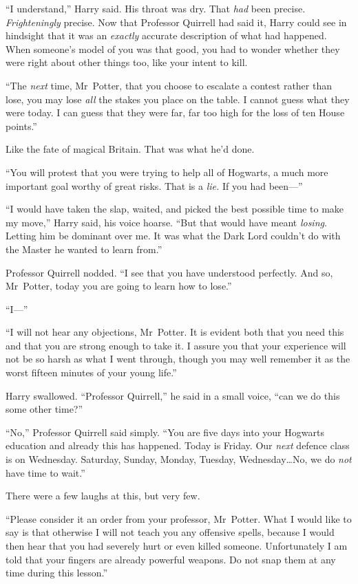 “I understand,” Harry said. His throat was dry. That \emph{had} been precise. \emph{Frighteningly} precise. Now that Professor Quirrell had said it, Harry could see in hindsight that it was an \emph{exactly} accurate description of what had happened. When someone’s model of you was that good, you had to wonder whether they were right about other things too, like your intent to kill.

“The \emph{next} time, Mr~Potter, that you choose to escalate a contest rather than lose, you may lose \emph{all} the stakes you place on the table. I cannot guess what they were today. I can guess that they were far, far too high for the loss of ten House points.”

Like the fate of magical Britain. That was what he’d done.

“You will protest that you were trying to help all of Hogwarts, a much more important goal worthy of great risks. That is a \emph{lie.} If you had been—”

“I would have taken the slap, waited, and picked the best possible time to make my move,” Harry said, his voice hoarse. “But that would have meant \emph{losing}. Letting him be dominant over me. It was what the Dark Lord couldn’t do with the Master he wanted to learn from.”

Professor Quirrell nodded. “I see that you have understood perfectly. And so, Mr~Potter, today you are going to learn how to lose.”

“I—”

“I will not hear any objections, Mr~Potter. It is evident both that you need this and that you are strong enough to take it. I assure you that your experience will not be so harsh as what I went through, though you may well remember it as the worst fifteen minutes of your young life.”

Harry swallowed. “Professor Quirrell,” he said in a small voice, “can we do this some other time?”

“No,” Professor Quirrell said simply. “You are five days into your Hogwarts education and already this has happened. Today is Friday. Our \emph{next} defence class is on Wednesday. Saturday, Sunday, Monday, Tuesday, Wednesday…No, we do \emph{not} have time to wait.”

There were a few laughs at this, but very few.

“Please consider it an order from your professor, Mr~Potter. What I would like to say is that otherwise I will not teach you any offensive spells, because I would then hear that you had severely hurt or even killed someone. Unfortunately I am told that your fingers are already powerful weapons. Do not snap them at any time during this lesson.”

